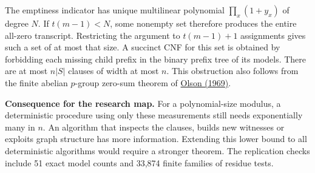 \documentclass[11pt,letterpaper]{article}
\newcommand{\lead}[1]{\textbf{\color{ink}#1}\enspace}
\newcommand{\citepaper}[2]{\href{#1}{#2}}
\begin{document}
The emptiness indicator has unique multilinear polynomial $\prod_x(1+y_x)$ of degree $N$. If $t(m-1)<N$, some nonempty set therefore produces the entire all-zero transcript. Restricting the argument to $t(m-1)+1$ assignments gives such a set of at most that size. A succinct CNF for this set is obtained by forbidding each missing child prefix in the binary prefix tree of its models. There are at most $n|S|$ clauses of width at most $n$. This obstruction also follows from the finite abelian $p$-group zero-sum theorem of \citepaper{https://doi.org/10.1016/0022-314X(69)90021-3}{Olson (1969)}.

\lead{Consequence for the research map.} For a polynomial-size modulus, a deterministic procedure using only these measurements still needs exponentially many in $n$. An algorithm that inspects the clauses, builds new witnesses or exploits graph structure has more information. Extending this lower bound to all deterministic algorithms would require a stronger theorem. The replication checks include 51 exact model counts and 33,874 finite families of residue tests.
\end{document}
